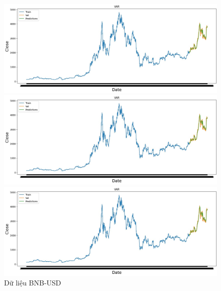 \documentclass[conference]{IEEEtran}
\begin{document}
	\begin{figure}[H]
		\centering
		\begin{minipage}{0.15\textwidth}
			\centering
			\includegraphics[width=1\textwidth]{Figure/BNB_VAR.jpg}
		\end{minipage}
		\hfill
		\begin{minipage}{0.15\textwidth}
			\centering
			\includegraphics[width=1\textwidth]{Figure/BNB_VAR.jpg}
		\end{minipage}
		\hfill
		\begin{minipage}{0.15\textwidth}
			\centering
			\includegraphics[width=1\textwidth]{Figure/BNB_VAR.jpg}
		\end{minipage}
		\caption{Dữ liệu BNB-USD}
		\label{fig:1}
	\end{figure}
	
\end{document}
